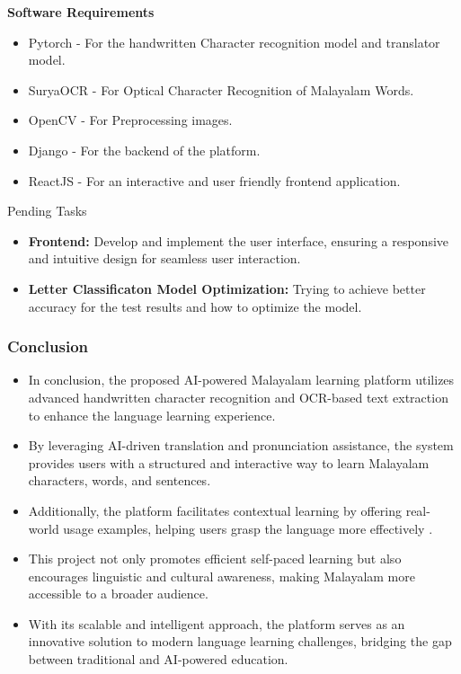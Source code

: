 \documentclass[aspectratio=169]{beamer}
\begin{document}
\begin{frame}
    \item \textbf{Software Requirements}     
        \begin{itemize}
            \item Pytorch - For the handwritten Character recognition model and translator model. 
            \item SuryaOCR - For Optical Character Recognition of Malayalam Words. 
            \item OpenCV - For Preprocessing images. 
            \item Django - For the backend of the platform.
            \item ReactJS - For an interactive and user friendly frontend application.
        \end{itemize}
\end{frame}

\begin{frame}{Pending Tasks}
    \begin{itemize}
        \item \textbf{Frontend:} Develop and implement the user interface, ensuring a responsive and intuitive design for seamless user interaction.
        \item \textbf{Letter Classificaton Model Optimization:} Trying to achieve better accuracy for the test results and how to optimize the model.
    \end{itemize}
\end{frame}

\begin{frame}
    \frametitle{Conclusion}
    \begin{itemize}
       \item In conclusion, the proposed AI-powered Malayalam learning platform utilizes advanced handwritten character recognition and OCR-based text extraction to enhance the language learning experience.
       \item By leveraging AI-driven translation and pronunciation assistance, the system provides users with a structured and interactive way to learn Malayalam characters, words, and sentences.
       \item Additionally, the platform facilitates contextual learning by offering real-world usage examples, helping users grasp the language more effectively .
       \item This project not only promotes efficient self-paced learning but also encourages linguistic and cultural awareness, making Malayalam more accessible to a broader audience.
       \item With its scalable and intelligent approach, the platform serves as an innovative solution to modern language learning challenges, bridging the gap between traditional and AI-powered education.
       
    \end{itemize}
\end{frame}
\end{document}
